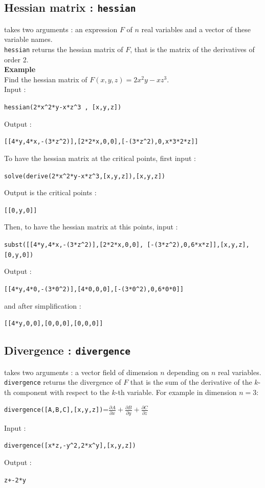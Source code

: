 \documentclass[a4paper,11pt]{book}
\begin{document}
\subsection{Hessian matrix : {\tt hessian}}
  takes two arguments : an 
expression $F$ of $n$ real variables and a vector of these variable names.\\
{\tt hessian} returns the hessian matrix of $F$, that is the matrix of the 
derivatives of order 2.\\
{\bf Example}\\
Find the hessian matrix of $F(x,y,z)=2x^2y-xz^3$.\\
Input :
\begin{center}{\tt hessian(2*x\verb|^|2*y-x*z\verb|^|3 , [x,y,z])}\end{center}
Output :
\begin{center}{\tt[[4*y,4*x,-(3*z\verb|^|2)],[2*2*x,0,0],[-(3*z\verb|^|2),0,x*3*2*z]]}\end{center}
To have the hessian matrix at the critical points, first input :
\begin{center}{\tt solve(derive(2*x\verb|^|2*y-x*z\verb|^|3,[x,y,z]),[x,y,z])}\end{center} 
Output is the critical points : 
\begin{center}{\tt [[0,y,0]]}\end{center}
Then, to have the hessian matrix at this points, input : 
\begin{center}{\tt subst([[4*y,4*x,-(3*z\verb|^|2)],[2*2*x,0,0], [-(3*z\verb|^|2),0,6*x*z]],[x,y,z],[0,y,0])}\end{center}
Output :
\begin{center}{\tt [[4*y,4*0,-(3*0\verb|^|2)],[4*0,0,0],[-(3*0\verb|^|2),0,6*0*0]]}\end{center}
and after simplification :
\begin{center}{\tt [[4*y,0,0],[0,0,0],[0,0,0]]}\end{center}

\subsection{Divergence : {\tt divergence}}
 takes two arguments : a vector 
field of dimension $n$ depending on $n$ real variables.\\
{\tt divergence} returns the divergence of $F$ that is the sum 
of the derivative of the $k$-th component with respect
to the $k$-th variable. For example in dimension $n=3$:
\begin{center}
  {\tt divergence([A,B,C],[x,y,z])}=$\displaystyle\frac{\partial A}{\partial x}+\frac{\partial B}{\partial y}+\frac{\partial C}{\partial z}$
\end{center}
Input :
\begin{center}{\tt divergence([x*z,-y\verb|^|2,2*x\verb|^|y],[x,y,z])}\end{center}
Output :
\begin{center}{\tt z+-2*y}\end{center}
\end{document}
